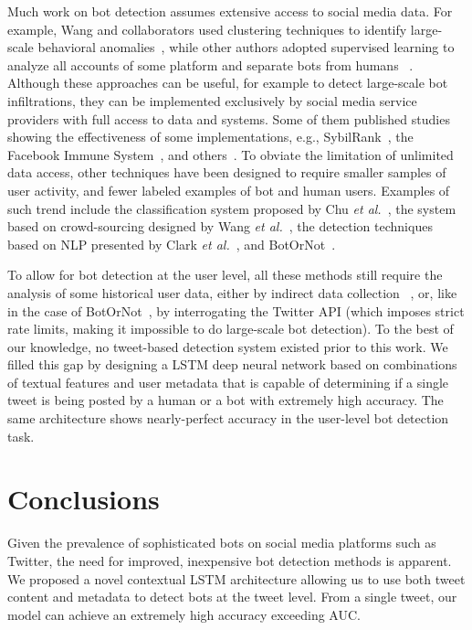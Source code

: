 Much work on bot detection assumes extensive access to social media data. For example, Wang and collaborators used clustering techniques to identify large-scale behavioral anomalies~\cite{wang2013you}, while other authors adopted supervised learning to analyze all accounts of some platform and separate bots from humans ~\cite{lee2011seven,beutel2013copycatch,elyashar2013homing,yang2014uncovering}. Although these approaches can be useful, for example to detect large-scale bot infiltrations, they can be implemented exclusively by social media service providers with full access to data and systems. Some of them  published studies showing the effectiveness of some implementations, e.g., SybilRank~\cite{cao2012aiding}, the Facebook Immune System~\cite{stein2011facebook}, and others~\cite{alvisi2013sok}.  
To obviate the limitation of unlimited data access, other techniques have been designed to require smaller samples of user activity, and fewer labeled examples of bot and human users. Examples of such trend include the classification system proposed by Chu \textit{et al.}~\cite{chu2010tweeting,chu2012detecting}, the system based on crowd-sourcing designed by Wang \textit{et al.}~\cite{wang2012social}, the detection techniques based on NLP presented by 
Clark \textit{et al.}~\cite{clark2016sifting}, and BotOrNot~\cite{davis2016botornot}. 

To allow for bot detection at the user level, all these methods still require the analysis of some historical user data, either by indirect data collection ~\cite{chu2010tweeting,chu2012detecting,wang2012social,clark2016sifting}, or, like in the case of BotOrNot~\cite{davis2016botornot}, by interrogating the Twitter API (which imposes strict rate limits, making it impossible to do large-scale bot detection). To the best of our knowledge, no tweet-based detection system existed prior to this work. We filled this gap by designing a LSTM deep neural network based on combinations of textual features and user metadata that is capable of determining if a single tweet is being posted by a human or a bot with extremely high accuracy. The same architecture shows nearly-perfect accuracy in the user-level bot detection task.

\section{Conclusions}



Given the prevalence of sophisticated bots on social media platforms such as Twitter, the need for improved, inexpensive bot detection methods is apparent. We proposed a novel contextual LSTM architecture allowing us to use both tweet content and metadata to detect bots at the tweet level. From a single tweet, our model can achieve an extremely high accuracy exceeding  AUC. 

